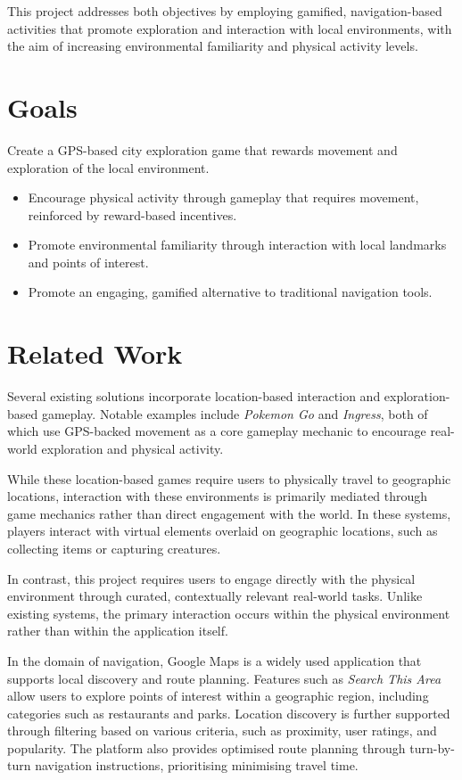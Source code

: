 \documentclass{vgtc}                          %
\begin{document}
This project addresses both objectives by employing gamified, navigation-based activities that promote exploration and interaction with local environments, with the aim of increasing environmental familiarity and physical activity levels.

\section{Goals}

Create a GPS-based city exploration game that rewards movement and exploration of the local environment.

\begin{itemize}
    \item Encourage physical activity through gameplay that requires movement, reinforced by reward-based incentives.
    \item Promote environmental familiarity through interaction with local landmarks and points of interest.
    \item Promote an engaging, gamified alternative to traditional navigation tools.
\end{itemize}

\section{Related Work}

Several existing solutions incorporate location-based interaction and exploration-based gameplay. Notable examples include \textit{Pokemon Go}\cite{pokemon_go} and \textit{Ingress}\cite{ingress}, both of which use GPS-backed movement as a core gameplay mechanic to encourage real-world exploration and physical activity.  

While these location-based games require users to physically travel to geographic locations, interaction with these environments is primarily mediated through game mechanics rather than direct engagement with the world. In these systems, players interact with virtual elements overlaid on geographic locations, such as collecting items or capturing creatures.

In contrast, this project requires users to engage directly with the physical environment through curated, contextually relevant real-world tasks. Unlike existing systems, the primary interaction occurs within the physical environment rather than within the application itself.

In the domain of navigation, Google Maps\cite{google_maps} is a widely used application that supports local discovery and route planning. Features such as \textit{Search This Area} allow users to explore points of interest within a geographic region, including categories such as restaurants and parks. Location discovery is further supported through filtering based on various criteria, such as proximity, user ratings, and popularity. The platform also provides optimised route planning through turn-by-turn navigation instructions, prioritising minimising travel time.
\end{document}
